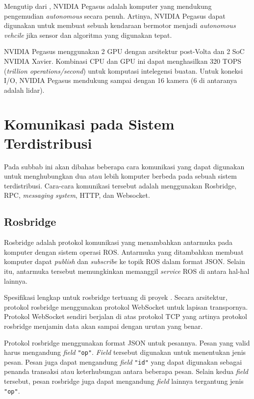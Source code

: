 Mengutip dari \parencite{oh_2017}, NVIDIA Pegasus adalah komputer yang
mendukung pengemudian \textit{autonomous} secara penuh. Artinya, NVIDIA Pegasus
dapat digunakan untuk membuat sebuah kendaraan bermotor menjadi
\textit{autonomous vehcile} jika sensor dan algoritma yang digunakan tepat.

NVIDIA Pegasus menggunakan 2 GPU dengan arsitektur post-Volta dan 2 SoC NVIDIA
Xavier. Kombinasi CPU dan GPU ini dapat menghasilkan 320 TOPS (\textit{trillion
operations/second}) untuk komputasi intelegensi buatan. Untuk koneksi I/O,
NVIDIA Pegasus mendukung sampai dengan 16 kamera (6 di antaranya adalah lidar).

\section{Komunikasi pada Sistem Terdistribusi}

Pada subbab ini akan dibahas beberapa cara komunikasi yang dapat digunakan
untuk menghubungkan dua atau lebih komputer berbeda pada sebuah sistem
terdistribusi. Cara-cara komunikasi tersebut adalah menggunakan Rosbridge, RPC,
\textit{messaging system}, HTTP, dan Websocket.

\subsection{Rosbridge}

Rosbridge adalah protokol komunikasi yang menambahkan antarmuka pada komputer
dengan sistem operasi ROS. Antarmuka yang ditambahkan membuat komputer dapat
\textit{publish} dan \textit{subscribe} ke topik ROS dalam format JSON. Selain
itu, antarmuka tersebut memungkinkan memanggil \textit{service} ROS di antara
hal-hal lainnya.

Spesifikasi lengkap untuk rosbridge tertuang di proyek \parencite{ros_bridge}.
Secara arsitektur, protokol rosbridge menggunakan protokol WebSocket untuk
lapisan transpornya. Protokol WebSocket sendiri berjalan di atas protokol TCP
yang artinya protokol rosbridge menjamin data akan sampai dengan urutan yang
benar.

Protokol rosbridge menggunakan format JSON untuk pesannya. Pesan yang valid
harus mengandung \textit{field} \texttt{"op"}. \textit{Field} tersebut
digunakan untuk menentukan jenis pesan. Pesan juga dapat mengandung
\textit{field} \texttt{"id"} yang dapat digunakan sebagai penanda transaksi
atau keterhubungan antara beberapa pesan. Selain kedua \textit{field} tersebut,
pesan rosbridge juga dapat mengandung \textit{field} lainnya tergantung jenis
\texttt{"op"}.

